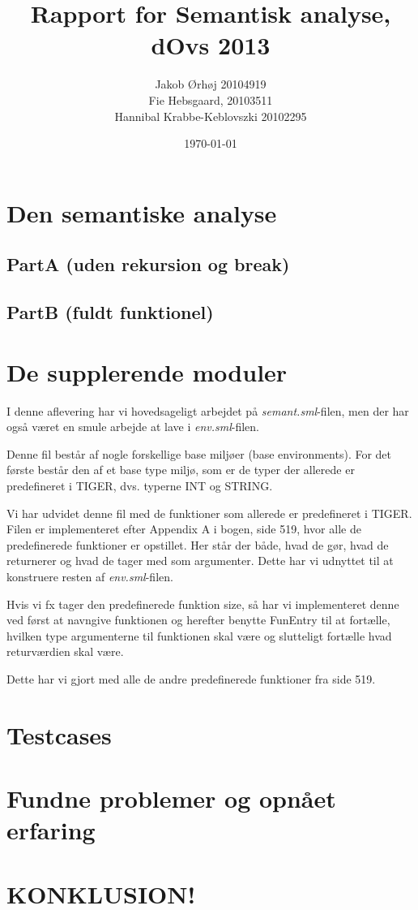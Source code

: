 \documentclass[a4paper,10p,danish]{article}
\begin{document}
\title{Rapport for Semantisk analyse, \\dOvs 2013}
\date{\today}
\author{Jakob Ørhøj 20104919\\ Fie Hebsgaard, 20103511 \\ Hannibal Krabbe-Keblovszki 20102295}
\maketitle
\thispagestyle{empty}
\section*{Den semantiske analyse}
\subsection*{PartA (uden rekursion og break)}

\subsection*{PartB (fuldt funktionel)}


\section*{De supplerende moduler}
I denne aflevering har vi hovedsageligt arbejdet på \textit{semant.sml}-filen, men der har også været en smule arbejde at lave i \textit{env.sml}-filen.

Denne fil består af nogle forskellige base miljøer (base environments). For det første består den af et base type miljø, som er de typer der allerede er predefineret i TIGER, dvs. typerne INT og STRING. 

Vi har udvidet denne fil med de funktioner som allerede er predefineret i TIGER. Filen er implementeret efter Appendix A i bogen, side 519, hvor alle de predefinerede funktioner er opstillet. Her står der både, hvad de gør, hvad de returnerer og hvad de tager med som argumenter. Dette har vi udnyttet til at konstruere resten af \textit{env.sml}-filen. 

Hvis vi fx tager den predefinerede funktion size, så har vi implementeret denne ved først at navngive funktionen og herefter benytte FunEntry til at fortælle, hvilken type argumenterne til funktionen skal være og slutteligt fortælle hvad returværdien skal være.

Dette har vi gjort med alle de andre predefinerede funktioner fra side 519.

\section*{Testcases}

\section*{Fundne problemer og opnået erfaring}

\section*{KONKLUSION!}
\end{document}
